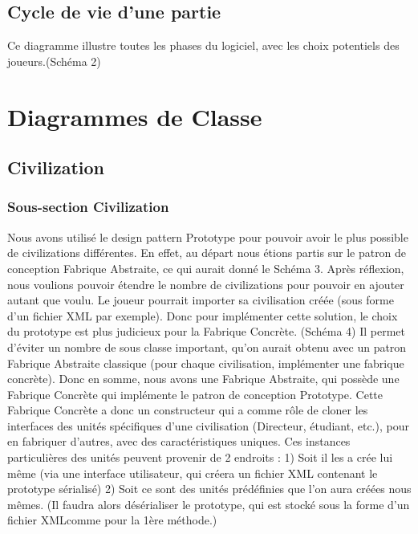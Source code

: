 	\subsection{Cycle de vie d'une partie}
	Ce diagramme illustre toutes les phases du logiciel, avec les choix potentiels des joueurs.(Schéma 2)
	
\section{Diagrammes de Classe}
	\subsection{Civilization}
		\subsubsection{Sous-section Civilization}
			Nous avons utilisé le design pattern Prototype pour pouvoir avoir le plus possible de civilizations différentes.
		En effet, au départ nous étions partis sur le patron de conception Fabrique Abstraite, ce qui aurait donné le Schéma 3.
			Après réflexion, nous voulions pouvoir étendre le nombre de civilizations pour pouvoir en ajouter autant que voulu.
		Le joueur pourrait importer sa civilisation créée (sous forme d'un fichier XML par exemple). 
		Donc pour implémenter cette solution, le choix du prototype est plus judicieux pour la Fabrique Concrète. (Schéma 4)
		Il permet d'éviter un nombre de sous classe important, qu'on aurait obtenu avec un patron Fabrique Abstraite classique (pour chaque civilisation, implémenter une fabrique concrète).
			Donc en somme, nous avons une Fabrique Abstraite, qui possède une Fabrique Concrète qui implémente le patron de conception Prototype.
			Cette Fabrique Concrète a donc un constructeur qui a comme rôle de cloner les interfaces des unités spécifiques d'une civilisation (Directeur, étudiant, etc.),
		pour en fabriquer d'autres, avec des caractéristiques uniques.
			Ces instances particulières des unités peuvent provenir de 2 endroits :
				1) Soit il les a crée lui même (via une interface utilisateur, qui créera un fichier XML contenant le prototype sérialisé)
				2) Soit ce sont des unités prédéfinies que l'on aura créées nous mêmes. (Il faudra alors désérialiser le prototype, qui est stocké sous la forme d'un fichier XMLcomme pour la 1ère méthode.)
		
